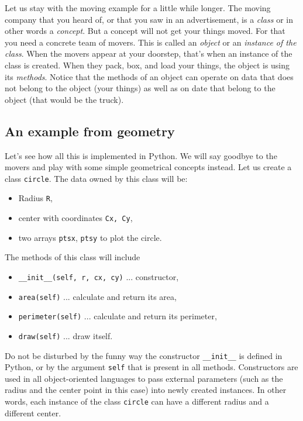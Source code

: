 Let us stay with the moving example for a little while longer. The moving 
company that you heard of, or that you saw in an advertisement, 
is a {\em class} or in other words a {\em concept}. But a concept 
will not get your things moved. For that you need a concrete team of 
movers. This is called an {\em object} or an {\em instance of the class}. 
When the movers appear at your doorstep, that's when an instance 
of the class is created. When they pack, box, and load your things, the object is using 
its {\em methods}. Notice that the methods of an object can operate 
on data that does not belong to the object (your things) as well as on date 
that belong to the object (that would be the truck). 

\subsection{An example from geometry}

Let's see how all this is implemented in Python. We will say goodbye to the movers
and play with some simple geometrical concepts instead. Let us create a class
{\tt circle}. The data owned by this class will be:

\begin{itemize}
\item Radius {\tt R}, 
\item center with coordinates {\tt Cx, Cy}, 
\item two arrays {\tt ptsx}, {\tt ptsy} to plot the circle. 
\end{itemize}
The methods of this class will include 
\begin{itemize}
\item {\tt \_\_init\_\_(self, r, cx, cy)} ... constructor,
\item {\tt area(self)} ... calculate and return its area,
\item {\tt perimeter(self)} ... calculate and return its perimeter,
\item {\tt draw(self)} ... draw itself.
\end{itemize}
Do not be disturbed by the funny way the constructor {\tt \_\_init\_\_} 
is defined in Python, or by the argument {\tt self} that is present 
in all methods. Constructors are 
used in all object-oriented languages to pass external parameters 
(such as the radius and the center point in this case) into newly 
created instances. In other words, each instance of the class {\tt circle} 
can have a different radius and a different center.

